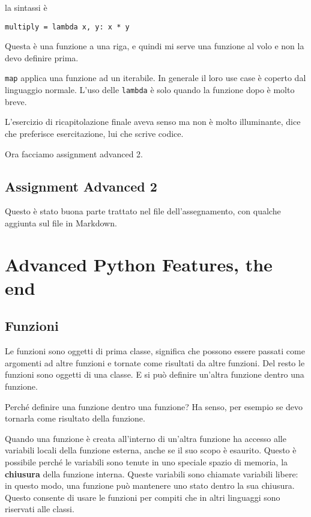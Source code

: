 \documentclass[10pt, a4paper, titlepage]{book}
\begin{document}
la sintassi è 
\begin{verbatim}
multiply = lambda x, y: x * y
\end{verbatim}

Questa è una funzione a una riga, e quindi mi serve una funzione al volo e non la devo definire prima.

\texttt{map} applica una funzione ad un iterabile.
In generale il loro use case è coperto dal linguaggio normale.
L'uso delle \texttt{lambda} è solo quando la funzione dopo è molto breve.

L'esercizio di ricapitolazione finale aveva senso ma non è molto illuminante, dice che preferisce esercitazione, lui che scrive codice.

Ora facciamo assignment advanced 2.

\subsection{Assignment Advanced 2}

Questo è stato buona parte trattato nel file dell'assegnamento, con qualche aggiunta sul file in Markdown.

\section{Advanced Python Features, the end}

\subsection{Funzioni}

Le funzioni sono oggetti di prima classe, significa che possono essere passati come argomenti ad altre funzioni e tornate come risultati da altre funzioni.
Del resto le funzioni sono oggetti di una classe. E si può definire un'altra funzione dentro una funzione.

Perché definire una funzione dentro una funzione? Ha senso, per esempio se devo tornarla come risultato della funzione.

Quando una funzione è creata all'interno di un'altra funzione ha accesso alle variabili locali della funzione esterna, anche se il suo scopo è esaurito. Questo è possibile perché le variabili sono tenute in uno speciale spazio di memoria, la \textbf{chiusura} della funzione interna.
Queste variabili sono chiamate variabili libere: in questo modo, una funzione può mantenere uno stato dentro la sua chiusura. Questo consente di usare le funzioni per compiti che in altri linguaggi sono riservati alle classi.
\end{document}
